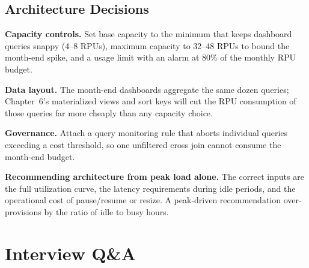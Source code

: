 \subsection{Architecture Decisions}
\textbf{Capacity controls.} Set base capacity to the minimum that keeps dashboard queries snappy (4--8 RPUs), maximum capacity to 32--48 RPUs to bound the month-end spike, and a usage limit with an alarm at 80\% of the monthly RPU budget.

\textbf{Data layout.} The month-end dashboards aggregate the same dozen queries; Chapter~6's materialized views and sort keys will cut the RPU consumption of those queries far more cheaply than any capacity choice.

\textbf{Governance.} Attach a query monitoring rule that aborts individual queries exceeding a cost threshold, so one unfiltered cross join cannot consume the month-end budget.

\begin{pitfall}
\textbf{Recommending architecture from peak load alone.} The correct inputs are the full utilization curve, the latency requirements during idle periods, and the operational cost of pause/resume or resize. A peak-driven recommendation over-provisions by the ratio of idle to busy hours.
\end{pitfall}

\section{Interview Q\&A}
